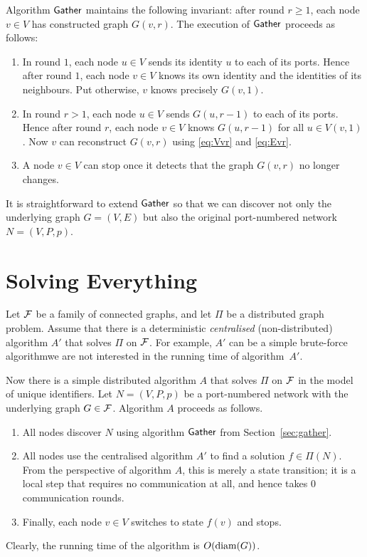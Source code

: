 Algorithm $\textsf{Gather}$ maintains the following invariant: after round $r \ge 1$, each node $v \in V$ has constructed graph $G(v,r)$. The execution of $\textsf{Gather}$ proceeds as follows:
\begin{enumerate}
    \item In round $1$, each node $u \in V$ sends its identity $u$ to each of its ports. Hence after round $1$, each node $v \in V$ knows its own identity and the identities of its neighbours. Put otherwise, $v$ knows precisely $G(v,1)$.
    \item In round $r > 1$, each node $u \in V$ sends $G(u,r-1)$ to each of its ports. Hence after round $r$, each node $v \in V$ knows $G(u,r-1)$ for all $u \in V(v,1)$. Now $v$ can reconstruct $G(v,r)$ using \eqref{eq:Vvr} and \eqref{eq:Evr}.
    \item A node $v \in V$ can stop once it detects that the graph $G(v,r)$ no longer changes.
\end{enumerate}

It is straightforward to extend $\textsf{Gather}$ so that we can discover not only the underlying graph $G = (V,E)$ but also the original port-numbered network $N = (V,P,p)$.


\section{Solving Everything}

Let $\mathcal{F}$ be a family of connected graphs, and let $\Pi$ be a distributed graph problem. Assume that there is a deterministic \emph{centralised} (non-distributed) algorithm $A'$ that solves $\Pi$ on $\mathcal{F}$. For example, $A'$ can be a simple brute-force algorithm\mydash we are not interested in the running time of algorithm~$A'$.

Now there is a simple distributed algorithm $A$ that solves $\Pi$ on $\mathcal{F}$ in the model of unique identifiers. Let $N = (V,P,p)$ be a port-numbered network with the underlying graph $G \in \mathcal{F}$. Algorithm $A$ proceeds as follows.
\begin{enumerate}
    \item All nodes discover $N$ using algorithm $\textsf{Gather}$ from Section~\ref{sec:gather}.
    \item All nodes use the centralised algorithm $A'$ to find a solution $f \in \Pi(N)$. From the perspective of algorithm $A$, this is merely a state transition; it is a local step that requires no communication at all, and hence takes $0$ communication rounds.
    \item Finally, each node $v \in V$ switches to state $f(v)$ and stops.
\end{enumerate}
Clearly, the running time of the algorithm is $O(\operatorname{diam}(G))$.

